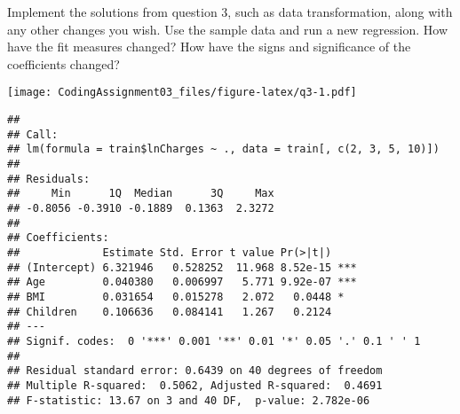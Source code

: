 \documentclass[
]{article}
\newenvironment{Shaded}{\begin{snugshade}}{\end{snugshade}}
\newcommand{\AttributeTok}[1]{\textcolor[rgb]{0.77,0.63,0.00}{#1}}
\newcommand{\DecValTok}[1]{\textcolor[rgb]{0.00,0.00,0.81}{#1}}
\newcommand{\FunctionTok}[1]{\textcolor[rgb]{0.00,0.00,0.00}{#1}}
\newcommand{\NormalTok}[1]{#1}
\newcommand{\OtherTok}[1]{\textcolor[rgb]{0.56,0.35,0.01}{#1}}
\newcommand{\SpecialCharTok}[1]{\textcolor[rgb]{0.00,0.00,0.00}{#1}}
\begin{document}
Implement the solutions from question 3, such as data transformation,
along with any other changes you wish. Use the sample data and run a new
regression. How have the fit measures changed? How have the signs and
significance of the coefficients changed?

\begin{Shaded}
\end{Shaded}

\texttt{[image: CodingAssignment03\_files/figure-latex/q3-1.pdf]}

\begin{Shaded}
\end{Shaded}

\begin{verbatim}
## 
## Call:
## lm(formula = train$lnCharges ~ ., data = train[, c(2, 3, 5, 10)])
## 
## Residuals:
##     Min      1Q  Median      3Q     Max 
## -0.8056 -0.3910 -0.1889  0.1363  2.3272 
## 
## Coefficients:
##             Estimate Std. Error t value Pr(>|t|)    
## (Intercept) 6.321946   0.528252  11.968 8.52e-15 ***
## Age         0.040380   0.006997   5.771 9.92e-07 ***
## BMI         0.031654   0.015278   2.072   0.0448 *  
## Children    0.106636   0.084141   1.267   0.2124    
## ---
## Signif. codes:  0 '***' 0.001 '**' 0.01 '*' 0.05 '.' 0.1 ' ' 1
## 
## Residual standard error: 0.6439 on 40 degrees of freedom
## Multiple R-squared:  0.5062, Adjusted R-squared:  0.4691 
## F-statistic: 13.67 on 3 and 40 DF,  p-value: 2.782e-06
\end{verbatim}
\end{document}
